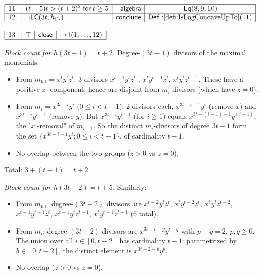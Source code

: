 \documentclass[11pt,reqno]{amsart}
\begin{document}
\nointerlineskip\noindent$%
\begin{array}{|m{0.5cm}|l|r|c|}
\hline
11 & (t+5)t>(t+2)^{2}\;\mathsf{for}\;t\ge5 & \mathsf{algebra} & \mathsf{Eq}%
(8,9,10) \\ \hline
12 & \neg\mathsf{LC}(3t,h_{\Gamma_{t}}) & \mathsf{conclude} & \mathsf{Def:}%
\ref{defi:IsLogConcaveUpTo}(11) \\ \hline
\end{array}%
$

\nointerlineskip\noindent$%
\begin{array}{|m{0.5cm}|l|r|c|}
\hline
13 & \top & \mathsf{close} & \to\mathsf{I}(1,\dots,12) \\ \hline
\end{array}%
$

\medskip \noindent\textit{Block count for $h(3t-1)=t+2$.} Degree-$(3t-1)$
divisors of the maximal monomials:

\begin{itemize}
\item From $m_{\mathrm{fat}}=x^{t}y^{t}z^{t}$: 3 divisors $x^{t-1}y^{t}z^{t}$%
, $x^{t}y^{t-1}z^{t}$, $x^{t}y^{t}z^{t-1}$. These have a positive $z$%
-component, hence are disjoint from $m_{i}$-divisors (which have $z=0$).

\item From $m_{i}=x^{3t-i}y^{i}$ ($0\le i<t-1$): 2 divisors each, $%
x^{3t-i-1}y^{i}$ (remove $x$) and $x^{3t-i}y^{i-1}$ (remove $y$). But $%
x^{3t-i}y^{i-1}$ (for $i\ge1$) equals $x^{3t-(i-1)-1}y^{(i-1)}$, the "$x$%
-removal" of $m_{i-1}$. So the distinct $m_{i}$-divisors of degree $3t-1$
form the set $\{x^{3t-i-1}y^{i}: 0\le i<t-1\}$, of cardinality $t-1$.

\item No overlap between the two groups ($z>0$ vs $z=0$).
\end{itemize}

Total: $3+(t-1)=t+2$.

\noindent\textit{Block count for $h(3t-2)=t+5$.} Similarly:

\begin{itemize}
\item From $m_{\mathrm{fat}}$: degree-$(3t-2)$ divisors are $%
x^{t-2}y^{t}z^{t}$, $x^{t}y^{t-2}z^{t}$, $x^{t}y^{t}z^{t-2}$, $%
x^{t-1}y^{t-1}z^{t}$, $x^{t-1}y^{t}z^{t-1}$, $x^{t}y^{t-1}z^{t-1}$ (6 total).

\item From $m_{i}$: degree-$(3t-2)$ divisors are $x^{3t-i-p}y^{i-q}$ with $%
p+q=2$, $p,q\ge0$. The union over all $i\in[0,t-2]$ has cardinality $t-1$:
parametrized by $b\in[0,t-2]$, the distinct element is $x^{3t-2-b}y^{b}$.

\item No overlap ($z>0$ vs $z=0$).
\end{itemize}
\end{document}
